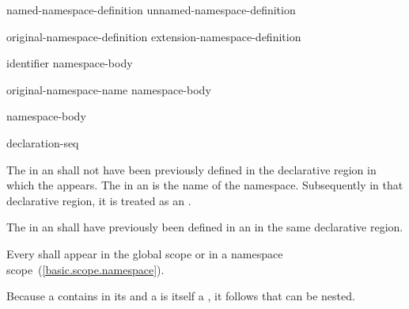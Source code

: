 \begin{bnf}
\br
        named-namespace-definition\br
        unnamed-namespace-definition
\end{bnf}

\begin{bnf}
\br
        original-namespace-definition\br
        extension-namespace-definition
\end{bnf}

\begin{bnf}
\br
          identifier \terminal{\{} namespace-body \terminal{\}}
\end{bnf}

\begin{bnf}
\br
          original-namespace-name \terminal{\{} namespace-body \terminal{\}}
\end{bnf}

\begin{bnf}
\br
          namespace-body \terminal{\}}
\end{bnf}

\begin{bnf}
\br
        declaration-seq\opt
\end{bnf}

\pnum
The  in an 
shall not have been previously defined in the declarative region in
which the  appears. The
 in an  is
the name of the namespace. Subsequently in that declarative region, it
is treated as an .

\pnum
The  in an
 shall have previously been
defined in an  in the same
declarative region.

\pnum
Every  shall appear in the global scope
or in a namespace scope~(\ref{basic.scope.namespace}).

\pnum
Because a  contains
 in its  and a
 is itself a , it
follows that  can be nested.
\enterexample

